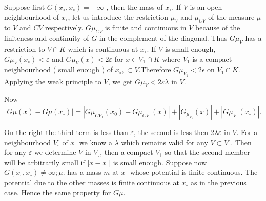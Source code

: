 Suppose first $G(x _ \circ,  x_\circ)  = + \infty$ ,  then the mass of
$x _\circ$. If $V$ is an open
neighbourhood of $x_\circ$, let us introduce the restriction $\mu_V$
and $\mu_{CV}$ of the measure $\mu$ to $V$ and $CV$ respectively.  $G
\mu_{CV}$ is finite and continuous in $V$ because of the finiteness and
continuity of $G$ in the complement of the diagonal. Thus $G \mu_V$
has a restriction to $V \cap K$ which is continuous at $x_\circ$.  If $V$ is
small enough,  $G \mu _V (x_\circ) < \varepsilon$ and $G \mu _V (x) <
2 \varepsilon$ for $x \in V_1 \cap K$ where $V_1$ is a
compact neighbourhood ( small enough ) of $x_\circ,  \subset
V$.\pageoriginale Therefore $G \mu_{V_1}< 2 \epsilon$ on $V_1 \cap K$.
Applying the weak principle to $V$, we get  $G\mu_V < 2 \varepsilon
\lambda$ in $V$.    

Now 
$$
|G \mu (x) - G \mu (x _\circ)|  = | G \mu_{C V_1}(x_0) 
 - G \mu_{C V_1} (x)|+| G_{\mu_{V_1}}(x)|+|G \mu_{V_1}(x_\circ)|. 
$$

On
 the right the third term is less than 
$\varepsilon$, the second is less then $2 \lambda \varepsilon$ in
$V$. For a neighbourhood $V_\circ $ of $x_\circ$ we know a $\lambda$
which remains valid for any $V \subset V_\circ$. Then for any
$\varepsilon $ we determine $V$ in $V_\circ$, then a compact $V_1$ so
that the second member will be arbitrarily small if $| x - x_\circ| $
is small enough.  Suppose now $G(x_\circ,  x_\circ) \neq \infty;
\mu$. has a mass $m$ at $x_\circ$ whose potential is finite
continuous. The potential due to the other masses is finite continuous
at $x_\circ$ as in the previous case. Hence the same property for $G
\mu$.  
